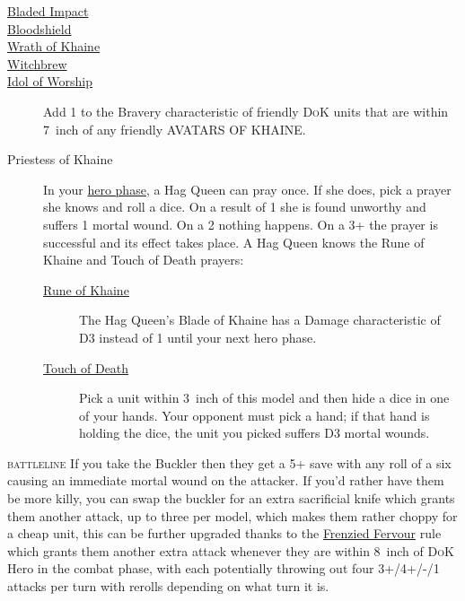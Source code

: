 \begin{description}
    \item [{\hyperref[bladed-impact]{Bladed Impact}}] 
    \item [{\hyperref[bloodshield]{Bloodshield}}]
    \item [{\hyperref[wrath-of-khaine]{Wrath of Khaine}}] 
    \item [{\hyperref[witchbrew]{Witchbrew}}]
    \item [{\hyperref[idol-of-worship]{Idol of Worship}}] Add 1 to the Bravery
        characteristic of friendly \textsc{DoK} units that are within 7~inch
        of any friendly AVATARS OF KHAINE.
    \item [Priestess of Khaine] In your \hyperref[hero-phase]{hero phase},
        a Hag Queen can pray once. If she does, pick a prayer she knows and
        roll a dice. On a result of 1 she is found unworthy and suffers
        1 mortal wound. On a 2 nothing happens. On a 3+ the prayer is
        successful and its effect takes place.  A Hag Queen knows the Rune of
        Khaine and Touch of Death prayers:
        \begin{description}
            \item [{\hyperref[rune-of-khaine]{Rune of Khaine}}] The Hag Queen's
                Blade of Khaine has a Damage characteristic of D3 instead of
                1 until your next hero phase.
            \item [{\hyperref[touch-of-death]{Touch of Death}}] Pick a unit within
                3~inch of this model and then hide a dice in one of your hands.
                Your opponent must pick a hand; if that hand is holding the
                dice, the unit you picked suffers D3 mortal wounds.
        \end{description}
\end{description}


\textsc{battleline} If you take the Buckler
then they get a 5+ save with any roll of a six causing an immediate mortal
wound on the attacker. If you'd rather have them be more killy, you can swap
the buckler for an extra sacrificial knife which grants them another attack, up
to three per model, which makes them rather choppy for a cheap unit, this can
be further upgraded thanks to the
\hyperref[frenzied-fervour]{Frenzied Fervour} rule which grants them another
extra attack whenever they are within 8~inch of \textsc{DoK} Hero in the combat phase,
with each potentially throwing out four 3+/4+/-/1 attacks per turn with
rerolls depending on what turn it is.

